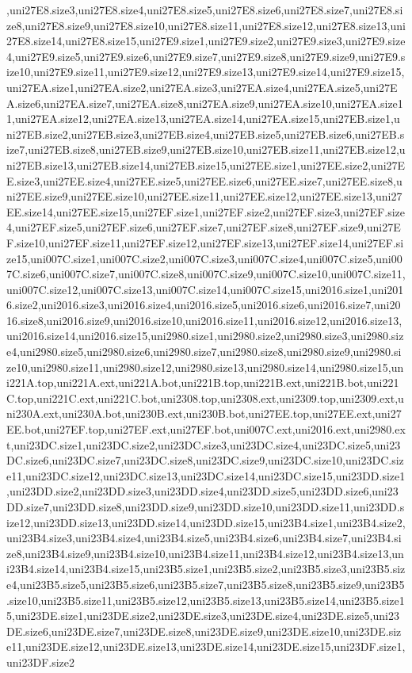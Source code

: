 ,uni27E8.size3,uni27E8.size4,uni27E8.size5,uni27E8.size6,uni27E8.size7,uni27E8.size8,uni27E8.size9,uni27E8.size10,uni27E8.size11,uni27E8.size12,uni27E8.size13,uni27E8.size14,uni27E8.size15,uni27E9.size1,uni27E9.size2,uni27E9.size3,uni27E9.size4,uni27E9.size5,uni27E9.size6,uni27E9.size7,uni27E9.size8,uni27E9.size9,uni27E9.size10,uni27E9.size11,uni27E9.size12,uni27E9.size13,uni27E9.size14,uni27E9.size15,uni27EA.size1,uni27EA.size2,uni27EA.size3,uni27EA.size4,uni27EA.size5,uni27EA.size6,uni27EA.size7,uni27EA.size8,uni27EA.size9,uni27EA.size10,uni27EA.size11,uni27EA.size12,uni27EA.size13,uni27EA.size14,uni27EA.size15,uni27EB.size1,uni27EB.size2,uni27EB.size3,uni27EB.size4,uni27EB.size5,uni27EB.size6,uni27EB.size7,uni27EB.size8,uni27EB.size9,uni27EB.size10,uni27EB.size11,uni27EB.size12,uni27EB.size13,uni27EB.size14,uni27EB.size15,uni27EE.size1,uni27EE.size2,uni27EE.size3,uni27EE.size4,uni27EE.size5,uni27EE.size6,uni27EE.size7,uni27EE.size8,uni27EE.size9,uni27EE.size10,uni27EE.size11,uni27EE.size12,uni27EE.size13,uni27EE.size14,uni27EE.size15,uni27EF.size1,uni27EF.size2,uni27EF.size3,uni27EF.size4,uni27EF.size5,uni27EF.size6,uni27EF.size7,uni27EF.size8,uni27EF.size9,uni27EF.size10,uni27EF.size11,uni27EF.size12,uni27EF.size13,uni27EF.size14,uni27EF.size15,uni007C.size1,uni007C.size2,uni007C.size3,uni007C.size4,uni007C.size5,uni007C.size6,uni007C.size7,uni007C.size8,uni007C.size9,uni007C.size10,uni007C.size11,uni007C.size12,uni007C.size13,uni007C.size14,uni007C.size15,uni2016.size1,uni2016.size2,uni2016.size3,uni2016.size4,uni2016.size5,uni2016.size6,uni2016.size7,uni2016.size8,uni2016.size9,uni2016.size10,uni2016.size11,uni2016.size12,uni2016.size13,uni2016.size14,uni2016.size15,uni2980.size1,uni2980.size2,uni2980.size3,uni2980.size4,uni2980.size5,uni2980.size6,uni2980.size7,uni2980.size8,uni2980.size9,uni2980.size10,uni2980.size11,uni2980.size12,uni2980.size13,uni2980.size14,uni2980.size15,uni221A.top,uni221A.ext,uni221A.bot,uni221B.top,uni221B.ext,uni221B.bot,uni221C.top,uni221C.ext,uni221C.bot,uni2308.top,uni2308.ext,uni2309.top,uni2309.ext,uni230A.ext,uni230A.bot,uni230B.ext,uni230B.bot,uni27EE.top,uni27EE.ext,uni27EE.bot,uni27EF.top,uni27EF.ext,uni27EF.bot,uni007C.ext,uni2016.ext,uni2980.ext,uni23DC.size1,uni23DC.size2,uni23DC.size3,uni23DC.size4,uni23DC.size5,uni23DC.size6,uni23DC.size7,uni23DC.size8,uni23DC.size9,uni23DC.size10,uni23DC.size11,uni23DC.size12,uni23DC.size13,uni23DC.size14,uni23DC.size15,uni23DD.size1,uni23DD.size2,uni23DD.size3,uni23DD.size4,uni23DD.size5,uni23DD.size6,uni23DD.size7,uni23DD.size8,uni23DD.size9,uni23DD.size10,uni23DD.size11,uni23DD.size12,uni23DD.size13,uni23DD.size14,uni23DD.size15,uni23B4.size1,uni23B4.size2,uni23B4.size3,uni23B4.size4,uni23B4.size5,uni23B4.size6,uni23B4.size7,uni23B4.size8,uni23B4.size9,uni23B4.size10,uni23B4.size11,uni23B4.size12,uni23B4.size13,uni23B4.size14,uni23B4.size15,uni23B5.size1,uni23B5.size2,uni23B5.size3,uni23B5.size4,uni23B5.size5,uni23B5.size6,uni23B5.size7,uni23B5.size8,uni23B5.size9,uni23B5.size10,uni23B5.size11,uni23B5.size12,uni23B5.size13,uni23B5.size14,uni23B5.size15,uni23DE.size1,uni23DE.size2,uni23DE.size3,uni23DE.size4,uni23DE.size5,uni23DE.size6,uni23DE.size7,uni23DE.size8,uni23DE.size9,uni23DE.size10,uni23DE.size11,uni23DE.size12,uni23DE.size13,uni23DE.size14,uni23DE.size15,uni23DF.size1,uni23DF.size2